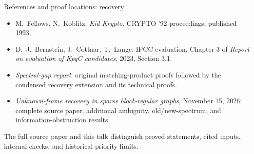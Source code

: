 \documentclass[aspectratio=169,11pt]{beamer}
\begin{document}
\begin{frame}{References and proof locations: recovery}
\small
\begin{itemize}
\item M.~Fellows, N.~Koblitz. \emph{Kid Krypto}. CRYPTO '92 proceedings,
published 1993.
\item D.~J.~Bernstein, J.~Cottaar, T.~Lange. IPCC evaluation, Chapter 3
of \emph{Report on evaluation of KpqC candidates}, 2023, Section 3.1.
\item \emph{Spectral-gap report}: original matching-product proofs followed
by the condensed recovery extension and its technical proofs.
\item \emph{Unknown-frame recovery in sparse block-regular graphs},
November 15, 2026: complete source paper, additional ambiguity,
old/new-spectrum, and information-obstruction results.
\end{itemize}
The full source paper and this talk distinguish proved statements,
cited inputs, internal checks, and historical-priority limits.
\end{frame}
\end{document}
